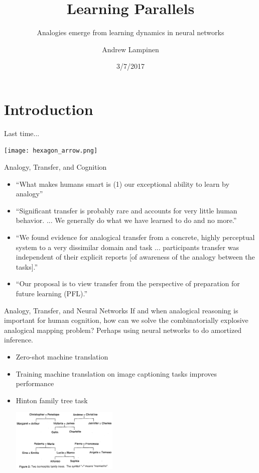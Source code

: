 \documentclass{beamer}
\begin{document}
\title{Learning Parallels}
\subtitle{Analogies emerge from learning dynamics in neural networks}
\author{Andrew Lampinen}
\date{3/7/2017}
\frame{\titlepage}


\section{Introduction}
\begin{frame}{Last time...}
\begin{center}
\texttt{[image: hexagon\_arrow.png]}
\end{center}
\end{frame}

\begin{frame}{Analogy, Transfer, and Cognition}
\begin{itemize}
    \item<1-> ``What makes humans smart is (1) our exceptional ability to learn by analogy'' \cite{Gentner2003} 
    \item<2-> ``Significant transfer is probably rare and accounts for very little human behavior. ... We generally do what we have learned to do and no more.'' \cite{Detterman1993}
    \item<3-> ``We found evidence for analogical transfer from a concrete, highly perceptual system to a very dissimilar domain and task ... participants transfer was independent of their explicit reports [of awareness of the analogy between the tasks].'' \cite{Day2011}
    \item<4-> ``Our proposal is to view transfer from the perspective of preparation for future learning (PFL).'' \cite{Bransford1999} 
\end{itemize}
\end{frame}

\begin{frame}{Analogy, Transfer, and Neural Networks}
If and when analogical reasoning is important for human cognition, how can we solve the combinatorially explosive analogical mapping problem? Perhaps using neural networks to do amortized inference. 
\begin{itemize}
    \item<2-> Zero-shot machine translation \cite{Johnson2016}
    \item<3-> Training machine translation on image captioning tasks improves performance \cite{Luong2016} 
    \item<4-> Hinton family tree task \cite{Hinton1986}
    \begin{center}
	\includegraphics[width = 0.4\textwidth]{../writing/cogsci_2017/figures/hinton_family_tree_figure.png}
    \end{center}
\end{itemize}
\end{frame}
\end{document}
